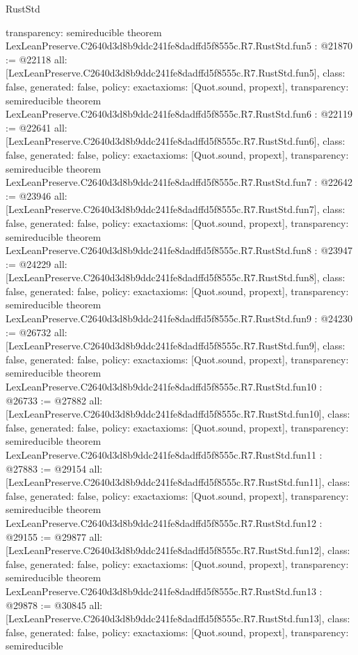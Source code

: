 \begin{lexlean}{RustStd}
\begin{coremodule}
{  transparency: semireducible
}
theorem LexLeanPreserve.C2640d3d8b9ddc241fe8dadffd5f8555c.R7.RustStd.fun5 : @21870 := @22118 {
  all: [LexLeanPreserve.C2640d3d8b9ddc241fe8dadffd5f8555c.R7.RustStd.fun5],
  class: false,
  generated: false,
  policy: exact{axioms: [Quot.sound, propext]},
  transparency: semireducible
}
theorem LexLeanPreserve.C2640d3d8b9ddc241fe8dadffd5f8555c.R7.RustStd.fun6 : @22119 := @22641 {
  all: [LexLeanPreserve.C2640d3d8b9ddc241fe8dadffd5f8555c.R7.RustStd.fun6],
  class: false,
  generated: false,
  policy: exact{axioms: [Quot.sound, propext]},
  transparency: semireducible
}
theorem LexLeanPreserve.C2640d3d8b9ddc241fe8dadffd5f8555c.R7.RustStd.fun7 : @22642 := @23946 {
  all: [LexLeanPreserve.C2640d3d8b9ddc241fe8dadffd5f8555c.R7.RustStd.fun7],
  class: false,
  generated: false,
  policy: exact{axioms: [Quot.sound, propext]},
  transparency: semireducible
}
theorem LexLeanPreserve.C2640d3d8b9ddc241fe8dadffd5f8555c.R7.RustStd.fun8 : @23947 := @24229 {
  all: [LexLeanPreserve.C2640d3d8b9ddc241fe8dadffd5f8555c.R7.RustStd.fun8],
  class: false,
  generated: false,
  policy: exact{axioms: [Quot.sound, propext]},
  transparency: semireducible
}
theorem LexLeanPreserve.C2640d3d8b9ddc241fe8dadffd5f8555c.R7.RustStd.fun9 : @24230 := @26732 {
  all: [LexLeanPreserve.C2640d3d8b9ddc241fe8dadffd5f8555c.R7.RustStd.fun9],
  class: false,
  generated: false,
  policy: exact{axioms: [Quot.sound, propext]},
  transparency: semireducible
}
theorem LexLeanPreserve.C2640d3d8b9ddc241fe8dadffd5f8555c.R7.RustStd.fun10 : @26733 := @27882 {
  all: [LexLeanPreserve.C2640d3d8b9ddc241fe8dadffd5f8555c.R7.RustStd.fun10],
  class: false,
  generated: false,
  policy: exact{axioms: [Quot.sound, propext]},
  transparency: semireducible
}
theorem LexLeanPreserve.C2640d3d8b9ddc241fe8dadffd5f8555c.R7.RustStd.fun11 : @27883 := @29154 {
  all: [LexLeanPreserve.C2640d3d8b9ddc241fe8dadffd5f8555c.R7.RustStd.fun11],
  class: false,
  generated: false,
  policy: exact{axioms: [Quot.sound, propext]},
  transparency: semireducible
}
theorem LexLeanPreserve.C2640d3d8b9ddc241fe8dadffd5f8555c.R7.RustStd.fun12 : @29155 := @29877 {
  all: [LexLeanPreserve.C2640d3d8b9ddc241fe8dadffd5f8555c.R7.RustStd.fun12],
  class: false,
  generated: false,
  policy: exact{axioms: [Quot.sound, propext]},
  transparency: semireducible
}
theorem LexLeanPreserve.C2640d3d8b9ddc241fe8dadffd5f8555c.R7.RustStd.fun13 : @29878 := @30845 {
  all: [LexLeanPreserve.C2640d3d8b9ddc241fe8dadffd5f8555c.R7.RustStd.fun13],
  class: false,
  generated: false,
  policy: exact{axioms: [Quot.sound, propext]},
  transparency: semireducible
}
\end{coremodule}
\end{lexlean}
